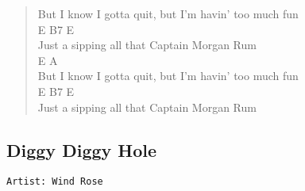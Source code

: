 \documentclass[11pt]{article}
\begin{document}
\begin{verse}
But I know I gotta quit, but I'm havin' too much fun\\
\hspace*{9em}E              B7             E\\
Just a sipping all that Captain Morgan Rum\\
\hspace*{4em}E                            A\\
But I know I gotta quit, but I'm havin' too much fun\\
\hspace*{9em}E              B7             E\\
Just a sipping all that Captain Morgan Rum\\
\end{verse}
\clearpage
\subsection{Diggy Diggy Hole}
\label{sec:org1fcddd0}
\begin{verbatim}
Artist: Wind Rose
\end{verbatim}
\end{document}
